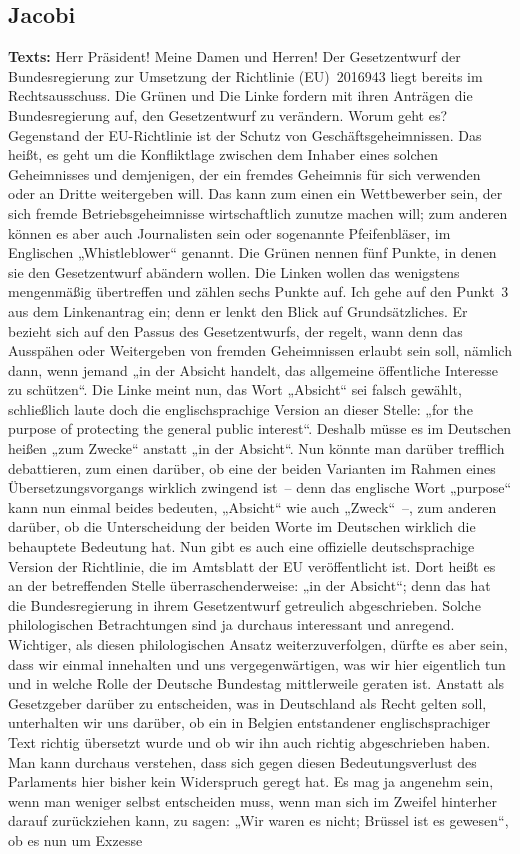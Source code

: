 \documentclass{article}
\begin{document}
\subsection{Jacobi}
\noindent\textbf{Texts:} Herr Präsident! Meine Damen und Herren! Der Gesetzentwurf der Bundesregierung zur Umsetzung der Richtlinie (EU) 2016\/943 liegt bereits im Rechtsausschuss. Die Grünen und Die Linke fordern mit ihren Anträgen die Bundesregierung auf, den Gesetzentwurf zu verändern.  Worum geht es? Gegenstand der EU-Richtlinie ist der Schutz von Geschäftsgeheimnissen. Das heißt, es geht um die Konfliktlage zwischen dem Inhaber eines solchen Geheimnisses und demjenigen, der ein fremdes Geheimnis für sich verwenden oder an Dritte weitergeben will. Das kann zum einen ein Wettbewerber sein, der sich fremde Betriebsgeheimnisse wirtschaftlich zunutze machen will; zum anderen können es aber auch Journalisten sein oder sogenannte Pfeifenbläser, im Englischen „Whistleblower“ genannt. Die Grünen nennen fünf Punkte, in denen sie den Gesetzentwurf abändern wollen. Die Linken wollen das wenigstens mengenmäßig übertreffen und zählen sechs Punkte auf. Ich gehe auf den Punkt 3 aus dem Linkenantrag ein; denn er lenkt den Blick auf Grundsätzliches. Er bezieht sich auf den Passus des Gesetzentwurfs, der regelt, wann denn das Ausspähen oder Weitergeben von fremden Geheimnissen erlaubt sein soll, nämlich dann, wenn jemand „in der Absicht handelt, das allgemeine öffentliche Interesse zu schützen“. Die Linke meint nun, das Wort „Absicht“ sei falsch gewählt, schließlich laute doch die englischsprachige Version an dieser Stelle: „for the purpose of protecting the general public interest“. Deshalb müsse es im Deutschen heißen „zum Zwecke“ anstatt „in der Absicht“. Nun könnte man darüber trefflich debattieren, zum einen darüber, ob eine der beiden Varianten im Rahmen eines Übersetzungsvorgangs wirklich zwingend ist – denn das englische Wort „purpose“ kann nun einmal beides bedeuten, „Absicht“ wie auch „Zweck“ –, zum anderen darüber, ob die Unterscheidung der beiden Worte im Deutschen wirklich die behauptete Bedeutung hat. Nun gibt es auch eine offizielle deutschsprachige Version der Richtlinie, die im Amtsblatt der EU veröffentlicht ist. Dort heißt es an der betreffenden Stelle überraschenderweise: „in der Absicht“; denn das hat die Bundesregierung in ihrem Gesetzentwurf getreulich abgeschrieben. Solche philologischen Betrachtungen sind ja durchaus interessant und anregend. Wichtiger, als diesen philologischen Ansatz weiterzuverfolgen, dürfte es aber sein, dass wir einmal innehalten und uns vergegenwärtigen, was wir hier eigentlich tun und in welche Rolle der Deutsche Bundestag mittlerweile geraten ist. Anstatt als Gesetzgeber darüber zu entscheiden, was in Deutschland als Recht gelten soll, unterhalten wir uns darüber, ob ein in Belgien entstandener englischsprachiger Text richtig übersetzt wurde und ob wir ihn auch richtig abgeschrieben haben. Man kann durchaus verstehen, dass sich gegen diesen Bedeutungsverlust des Parlaments hier bisher kein Widerspruch geregt hat. Es mag ja angenehm sein, wenn man weniger selbst entscheiden muss, wenn man sich im Zweifel hinterher darauf zurückziehen kann, zu sagen: „Wir waren es nicht; Brüssel ist es gewesen“, ob es nun um Exzesse 
\end{document}
